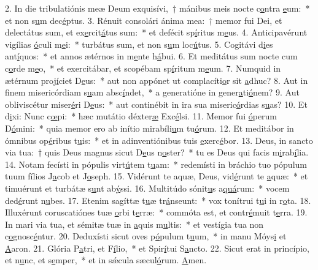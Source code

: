 2. In die tribulatiónis meæ Deum exquisívi,~† mánibus meis nocte c\uline{o}ntra \uline{e}um:~* et non s\uline{u}m dec\uline{é}ptus.
3. Rénuit consolári ánima mea:~† memor fui Dei, et delectátus sum, et ex\uline{e}rcit\uline{á}tus sum:~* et defécit sp\uline{í}ritus m\uline{e}us.
4. Anticipavérunt vigílias \uline{ó}culi m\uline{e}i:~* turbátus sum, et non s\uline{u}m loc\uline{ú}tus.
5. Cogitávi d\uline{i}es ant\uline{í}quos:~* et annos ætérnos in m\uline{e}nte h\uline{á}bui.
6. Et meditátus sum nocte cum c\uline{o}rde m\uline{e}o,~* et exercitábar, et scopébam sp\uline{í}ritum m\uline{e}um.
7. Numquid in ætérnum proj\uline{í}ciet D\uline{e}us:~* aut non appónet ut complacíti\uline{o}r sit \uline{a}dhuc?
8. Aut in finem misericórdiam s\uline{u}am absc\uline{í}ndet,~* a generatióne in gener\uline{a}ti\uline{ó}nem?
9. Aut obliviscétur miser\uline{é}ri D\uline{e}us:~* aut continébit in ira sua miseric\uline{ó}rdias s\uline{u}as?
10. Et d\uline{i}xi: Nunc c\uline{œ}pi:~* hæc mutátio déxter\uline{æ} Exc\uline{é}lsi.
11. Memor fui \uline{ó}perum D\uline{ó}mini:~* quia memor ero ab inítio mirabíli\uline{u}m tu\uline{ó}rum.
12. Et meditábor in ómnibus op\uline{é}ribus t\uline{u}is:~* et in adinventiónibus tuis \uline{e}xerc\uline{é}bor.
13. Deus, in sancto via tua:~† quis Deus magnus sicut D\uline{e}us n\uline{o}ster?~* tu es Deus qui facis m\uline{i}rab\uline{í}lia.
14. Notam fecísti in pópulis virt\uline{ú}tem t\uline{u}am:~* redemísti in bráchio tuo pópulum tuum fílios J\uline{a}cob et J\uline{o}seph.
15. Vidérunt te aquæ, Deus, vid\uline{é}runt te \uline{a}quæ:~* et timuérunt et turbátæ s\uline{u}nt ab\uline{ý}ssi.
16. Multitúdo sónit\uline{u}s a\uline{quá}rum:~* vocem ded\uline{é}runt n\uline{u}bes.
17. Etenim sagíttæ t\uline{u}æ tr\uline{á}nseunt:~* vox tonítrui t\uline{u}i in r\uline{o}ta.
18. Illuxérunt coruscatiónes tuæ \uline{o}rbi t\uline{e}rræ:~* commóta est, et contr\uline{é}muit t\uline{e}rra.
19. In mari via tua, et sémitæ tuæ in \uline{a}quis m\uline{u}ltis:~* et vestígia tua non c\uline{o}gnosc\uline{é}ntur.
20. Deduxísti sicut oves p\uline{ó}pulum t\uline{u}um,~* in manu Móys\uline{i} et \uline{A}aron.
21. Glória P\uline{a}tri, et F\uline{í}lio,~* et Spir\uline{í}tui S\uline{a}ncto.
22. Sicut erat in princípio, et n\uline{u}nc, et s\uline{e}mper,~* et in sǽcula sæcul\uline{ó}rum. \uline{A}men.

